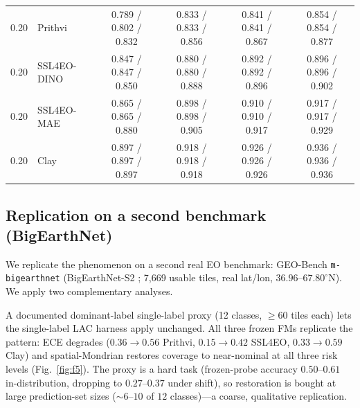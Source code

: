 \documentclass[11pt]{article}
\begin{document}
\begin{table}[t]
{\begin{tabular}{clcccc}
\midrule
0.20 & Prithvi & 0.789 / 0.802 / 0.832\rlap{$^{\dagger}$} & 0.833 / 0.833 / 0.856\rlap{$^{\dagger}$} & 0.841 / 0.841 / 0.867\rlap{$^{\dagger}$} & 0.854 / 0.854 / 0.877\rlap{$^{\dagger}$} \\
0.20 & SSL4EO-DINO & 0.847 / 0.847 / 0.850\rlap{$^{\dagger}$} & 0.880 / 0.880 / 0.888\rlap{$^{\dagger}$} & 0.892 / 0.892 / 0.896\rlap{$^{\dagger}$} & 0.896 / 0.896 / 0.902\rlap{$^{\dagger}$} \\
0.20 & SSL4EO-MAE & 0.865 / 0.865 / 0.880\rlap{$^{\dagger}$} & 0.898 / 0.898 / 0.905\rlap{$^{\dagger}$} & 0.910 / 0.910 / 0.917\rlap{$^{\dagger}$} & 0.917 / 0.917 / 0.929\rlap{$^{\dagger}$} \\
0.20 & Clay & 0.897 / 0.897 / 0.897\rlap{$^{\dagger}$} & 0.918 / 0.918 / 0.918\rlap{$^{\dagger}$} & 0.926 / 0.926 / 0.926\rlap{$^{\dagger}$} & 0.936 / 0.936 / 0.936\rlap{$^{\dagger}$} \\
\bottomrule
\end{tabular}}
\end{table}

\subsection*{Replication on a second benchmark (BigEarthNet)}
We replicate the phenomenon on a second real EO benchmark: GEO-Bench \citep{lacoste2023geobench} \texttt{m-bigearthnet}
(BigEarthNet-S2 \citep{sumbul2019bigearthnet}; 7{,}669 usable tiles, real lat/lon, $36.96$--$67.80^\circ$N). We apply two complementary
analyses.

A documented dominant-label single-label proxy (12 classes, $\ge60$ tiles each)
lets the single-label LAC harness apply unchanged. All three frozen FMs replicate the pattern: ECE degrades
($0.36\to0.56$ Prithvi, $0.15\to0.42$ SSL4EO, $0.33\to0.59$ Clay) and spatial-Mondrian restores coverage
to near-nominal at all three risk levels (Fig.~\ref{fig:f5}). The proxy is a hard task (frozen-probe accuracy $0.50$--$0.61$
in-distribution, dropping to $0.27$--$0.37$ under shift), so restoration is bought at large prediction-set
sizes (${\sim}6$--$10$ of $12$ classes)---a coarse, qualitative replication.
\end{document}
